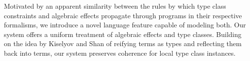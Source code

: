 Motivated by an apparent similarity between the rules by which type class constraints and algebraic effects propagate through programs in their respective formalisms, we introduce a novel language feature capable of modeling both. Our system offers a uniform treatment of algebraic effects and type classes. Building on the idea \cite{kiselyov04} by Kiselyov and Shan of reifying terms as types and reflecting them back into terms, our system preserves coherence for local type class instances.
